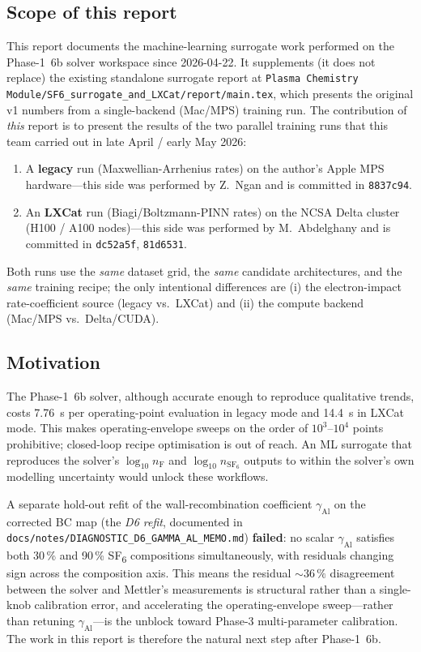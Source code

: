 \documentclass[11pt,a4paper]{article}
\begin{document}
\subsection{Scope of this report}
This report documents the machine-learning surrogate work performed on
the Phase-1~6b solver workspace since 2026-04-22.  It supplements (it
does not replace) the existing standalone surrogate report at
\texttt{Plasma Chemistry Module/SF6\_surrogate\_and\_LXCat/report/main.tex},
which presents the original v1 numbers from a single-backend (Mac/MPS)
training run.  The contribution of \emph{this} report is to present the
results of the two parallel training runs that this team carried out
in late April / early May 2026:
\begin{enumerate}[itemsep=2pt,topsep=2pt]
  \item A \textbf{legacy} run (Maxwellian-Arrhenius rates) on the
        author's Apple MPS hardware---this side was performed by
        Z.~Ngan and is committed in
        \texttt{8837c94}.
  \item An \textbf{LXCat} run (Biagi/Boltzmann-PINN rates) on the
        NCSA Delta cluster (H100 / A100 nodes)---this side was
        performed by M.~Abdelghany and is committed in
        \texttt{dc52a5f}, \texttt{81d6531}.
\end{enumerate}
Both runs use the \emph{same} dataset grid, the \emph{same} candidate
architectures, and the \emph{same} training recipe; the only
intentional differences are (i) the electron-impact rate-coefficient
source (legacy vs.\ LXCat) and (ii) the compute backend (Mac/MPS vs.\
Delta/CUDA).

\subsection{Motivation}
The Phase-1~6b solver, although accurate enough to reproduce
qualitative trends, costs \SI{7.76}{\second} per operating-point
evaluation in legacy mode and \SI{14.4}{\second} in LXCat mode.  This
makes operating-envelope sweeps on the order of $10^3$--$10^4$ points
prohibitive; closed-loop recipe optimisation is out of reach.  An
ML surrogate that reproduces the solver's $\log_{10}n_\mathrm{F}$
and $\log_{10}n_{\mathrm{SF}_6}$ outputs to within the solver's own
modelling uncertainty would unlock these workflows.

A separate hold-out refit of the wall-recombination coefficient
$\gamma_\mathrm{Al}$ on the corrected BC map (the \emph{D6 refit},
documented in \texttt{docs/notes/DIAGNOSTIC\_D6\_GAMMA\_AL\_MEMO.md})
\textbf{failed}: no scalar $\gamma_\mathrm{Al}$ satisfies
both 30\,\% and 90\,\% SF\textsubscript{6} compositions
simultaneously, with residuals changing sign across the composition
axis.  This means the residual ${\sim}36\,\%$ disagreement between
the solver and Mettler's measurements is structural rather than a
single-knob calibration error, and accelerating the operating-envelope
sweep---rather than retuning $\gamma_\mathrm{Al}$---is the unblock
toward Phase-3 multi-parameter calibration.  The work in this report
is therefore the natural next step after Phase-1~6b.
\end{document}
